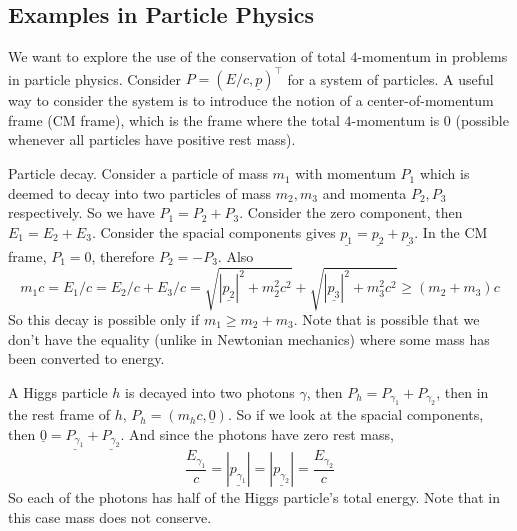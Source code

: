 \subsection{Examples in Particle Physics}
We want to explore the use of the conservation of total $4$-momentum in problems in particle physics.
Consider $P=(E/c,\underline{p})^\top$ for a system of particles.
A useful way to consider the system is to introduce the notion of a center-of-momentum frame (CM frame), which is the frame where the total $4$-momentum is $0$ (possible whenever all particles have positive rest mass).
\begin{example}
    Particle decay.
    Consider a particle of mass $m_1$ with momentum $P_1$ which is deemed to decay into two particles of mass $m_2,m_3$ and momenta $P_2,P_3$ respectively.
    So we have $P_1=P_2+P_3$.
    Consider the zero component, then $E_1=E_2+E_3$.
    Consider the spacial components gives $\underline{p_1}=\underline{p_2}+\underline{p_3}$.
    In the CM frame, $P_1=0$, therefore $P_2=-P_3$.
    Also
    $$m_1c=E_1/c=E_2/c+E_3/c=\sqrt{|\underline{p_2}|^2+m_2^2c^2}+\sqrt{|\underline{p_3}|^2+m_3^2c^2}\ge (m_2+m_3)c$$
    So this decay is possible only if $m_1\ge m_2+m_3$.
    Note that is possible that we don't have the equality (unlike in Newtonian mechanics) where some mass has been converted to energy.
\end{example}
\begin{example}
    A Higgs particle $h$ is decayed into two photons $\gamma$, then $P_h=P_{\gamma_1}+P_{\gamma_2}$, then in the rest frame of $h$, $P_h=(m_hc,\underline{0})$.
    So if we look at the spacial components, then $\underline{0}=\underline{P_{\gamma_1}}+\underline{P_{\gamma_2}}$.
    And since the photons have zero rest mass,
    $$\frac{E_{\gamma_1}}{c}=|\underline{p_{\gamma_1}}|=|\underline{p_{\gamma_2}}|=\frac{E_{\gamma_2}}{c}$$
    So each of the photons has half of the Higgs particle's total energy.
    Note that in this case mass does not conserve.
\end{example}
